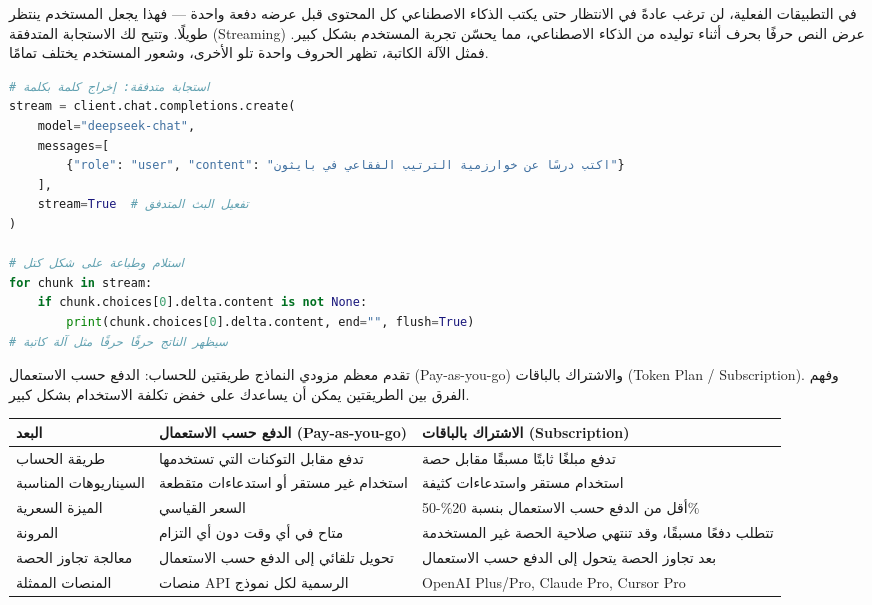 
في التطبيقات الفعلية، لن ترغب عادةً في الانتظار حتى يكتب الذكاء الاصطناعي كل المحتوى قبل عرضه دفعة واحدة — فهذا يجعل المستخدم ينتظر طويلًا. وتتيح لك الاستجابة المتدفقة (Streaming) عرض النص حرفًا بحرف أثناء توليده من الذكاء الاصطناعي، مما يحسّن تجربة المستخدم بشكل كبير. فمثل الآلة الكاتبة، تظهر الحروف واحدة تلو الأخرى، وشعور المستخدم يختلف تمامًا.

\begin{lstlisting}[language=Python]
# استجابة متدفقة: إخراج كلمة بكلمة
stream = client.chat.completions.create(
    model="deepseek-chat",
    messages=[
        {"role": "user", "content": "اكتب درسًا عن خوارزمية الترتيب الفقاعي في بايثون"}
    ],
    stream=True  # تفعيل البث المتدفق
)

# استلام وطباعة على شكل كتل
for chunk in stream:
    if chunk.choices[0].delta.content is not None:
        print(chunk.choices[0].delta.content, end="", flush=True)
# سيظهر الناتج حرفًا حرفًا مثل آلة كاتبة
\end{lstlisting}


تقدم معظم مزودي النماذج طريقتين للحساب: الدفع حسب الاستعمال (Pay-as-you-go) والاشتراك بالباقات (Token Plan / Subscription). وفهم الفرق بين الطريقتين يمكن أن يساعدك على خفض تكلفة الاستخدام بشكل كبير.


\begin{center}
\begin{tabularx}{\linewidth}{|X|X|X|}
\hline
\textbf{البعد} & \textbf{الدفع حسب الاستعمال (Pay-as-you-go)} & \textbf{الاشتراك بالباقات (Subscription)} \tabularnewline
\hline
طريقة الحساب & تدفع مقابل التوكنات التي تستخدمها & تدفع مبلغًا ثابتًا مسبقًا مقابل حصة \tabularnewline
السيناريوهات المناسبة & استخدام غير مستقر أو استدعاءات متقطعة & استخدام مستقر واستدعاءات كثيفة \tabularnewline
الميزة السعرية & السعر القياسي & أقل من الدفع حسب الاستعمال بنسبة 20\%-50\% \tabularnewline
المرونة & متاح في أي وقت دون أي التزام & تتطلب دفعًا مسبقًا، وقد تنتهي صلاحية الحصة غير المستخدمة \tabularnewline
معالجة تجاوز الحصة & تحويل تلقائي إلى الدفع حسب الاستعمال & بعد تجاوز الحصة يتحول إلى الدفع حسب الاستعمال \tabularnewline
المنصات الممثلة & منصات API الرسمية لكل نموذج & OpenAI Plus/Pro, Claude Pro, Cursor Pro \tabularnewline
\hline
\end{tabularx}
\end{center}

